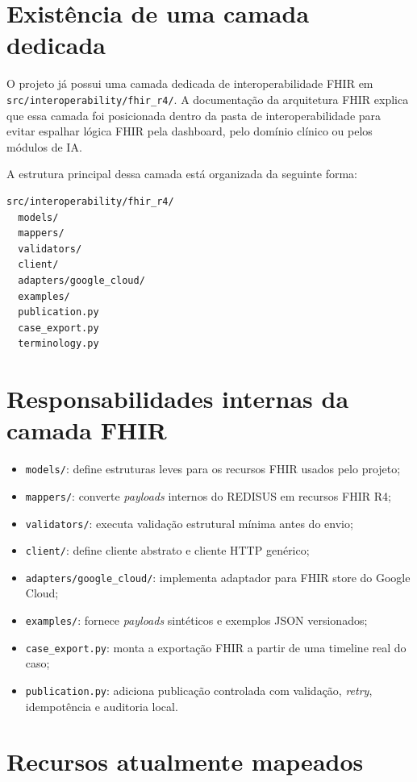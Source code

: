 \documentclass[
    12pt,
    openright,
    oneside,
    a4paper,
    chapter=TITLE,
    section=TITLE,
    brazil,
    sumario=tradicional,
    hidelinks
]{abntex2}
\begin{document}
\section{Exist\^encia de uma camada dedicada}

O projeto j\'a possui uma camada dedicada de interoperabilidade FHIR em \texttt{src/interoperability/fhir\_r4/}. A documenta\c{c}\~ao da arquitetura FHIR explica que essa camada foi posicionada dentro da pasta de interoperabilidade para evitar espalhar l\'ogica FHIR pela dashboard, pelo dom\'inio cl\'inico ou pelos m\'odulos de IA.

A estrutura principal dessa camada est\'a organizada da seguinte forma:

\begin{lstlisting}
src/interoperability/fhir_r4/
  models/
  mappers/
  validators/
  client/
  adapters/google_cloud/
  examples/
  publication.py
  case_export.py
  terminology.py
\end{lstlisting}

\section{Responsabilidades internas da camada FHIR}

\begin{itemize}
    \item \texttt{models/}: define estruturas leves para os recursos FHIR usados pelo projeto;
    \item \texttt{mappers/}: converte \textit{payloads} internos do REDISUS em recursos FHIR R4;
    \item \texttt{validators/}: executa valida\c{c}\~ao estrutural m\'inima antes do envio;
    \item \texttt{client/}: define cliente abstrato e cliente HTTP gen\'erico;
    \item \texttt{adapters/google\_cloud/}: implementa adaptador para FHIR store do Google Cloud;
    \item \texttt{examples/}: fornece \textit{payloads} sint\'eticos e exemplos JSON versionados;
    \item \texttt{case\_export.py}: monta a exporta\c{c}\~ao FHIR a partir de uma timeline real do caso;
    \item \texttt{publication.py}: adiciona publica\c{c}\~ao controlada com valida\c{c}\~ao, \textit{retry}, idempot\^encia e auditoria local.
\end{itemize}

\section{Recursos atualmente mapeados}
\end{document}
